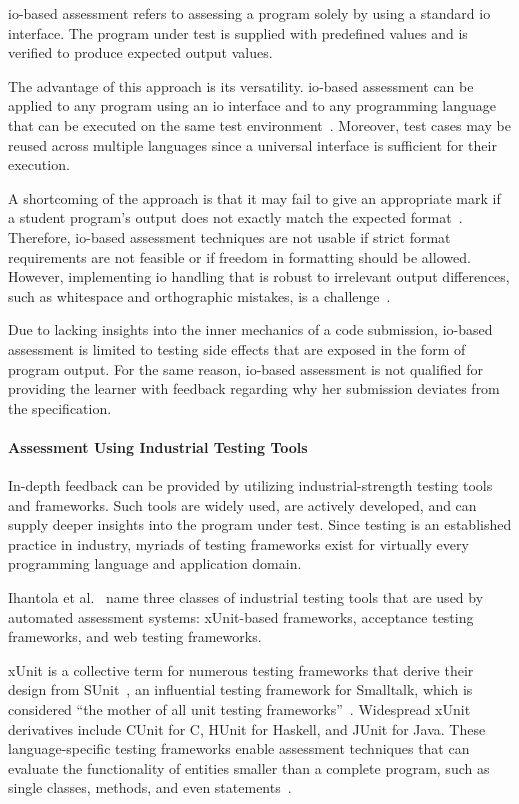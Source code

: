 \Gls{io}-based assessment refers to assessing a program solely by using a standard \gls{io} interface. The program under test is supplied with predefined values and is verified to produce expected output values.

The advantage of this approach is its versatility. \Gls{io}-based assessment can be applied to any program using an \gls{io} interface and to any programming language that can be executed on the same test environment~\cite{ihantola2010review}. Moreover, test cases may be reused across multiple languages since a universal interface is sufficient for their execution.

A shortcoming of the approach is that it may fail to give an appropriate mark if a student program's output does not exactly match the expected format~\cite{pieterse2013automated}. Therefore, \gls{io}-based assessment techniques are not usable if strict format requirements are not feasible or if freedom in formatting should be allowed. However, implementing \gls{io} handling that is robust to irrelevant output differences, such as whitespace and orthographic mistakes, is a challenge~\cite{douce2005automatic}.

Due to lacking insights into the inner mechanics of a code submission, \gls{io}-based assessment is limited to testing side effects that are exposed in the form of program output. For the same reason, \gls{io}-based assessment is not qualified for providing the learner with feedback regarding why her submission deviates from the specification.

\paragraph{Assessment Using Industrial Testing Tools}

In-depth feedback can be provided by utilizing industrial-strength testing tools and frameworks. Such tools are widely used, are actively developed, and can supply deeper insights into the program under test. Since testing is an established practice in industry, myriads of testing frameworks exist for virtually every programming language and application domain.

Ihantola et al.~\cite{ihantola2010review} name three classes of industrial testing tools that are used by automated assessment systems: xUnit-based frameworks, acceptance testing frameworks, and web testing frameworks.

xUnit is a collective term for numerous testing frameworks that derive their design from SUnit~\cite{beck1994simple}, an influential testing framework for Smalltalk, which is considered ``the mother of all unit testing frameworks''~\cite{ducasse2003sunit}. Widespread xUnit derivatives include CUnit for C, HUnit for Haskell, and JUnit for Java. These language-specific testing frameworks enable assessment techniques that can evaluate the functionality of entities smaller than a complete program, such as single classes, methods, and even statements~\cite{ala2005survey}.

